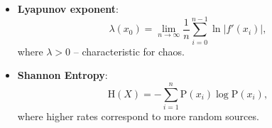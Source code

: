 


\begin{itemize}
    \item \textbf{Lyapunov exponent}:
\begin{equation*}
    \lambda (x_{0})=\lim _{n\to \infty }{\frac {1}{n}}\sum _{i=0}^{n-1}\ln |f'(x_{i})|,
\end{equation*}
where $\lambda >0$ -- characteristic for chaos.
    \vspace{10mm}

    \item \textbf{Shannon  Entropy}:
\begin{equation*}
    \mathrm {H} (X)=-\sum _{i=1}^{n}{\mathrm {P} (x_{i})\log \mathrm {P} (x_{i})},
\end{equation*}
where higher rates correspond to more random sources.
\end{itemize}